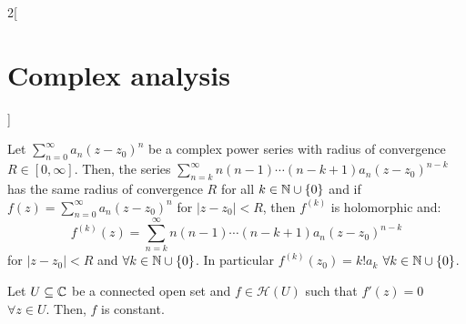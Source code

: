 \documentclass[../../../main_math.tex]{subfiles}
\begin{document}
\begin{multicols}{2}[\section{Complex analysis}]
\begin{theorem}
  \end{theorem}
  \begin{corollary}
    Let $\sum_{n=0}^\infty a_n{(z-z_0)}^n$ be a complex power series with radius of convergence $R\in[0,\infty]$. Then, the series $\sum_{n=k}^\infty n(n-1)\cdots(n-k+1)a_n{(z-z_0)}^{n-k}$ has the same radius of convergence $R$ for all $k\in\mathbb{N} \cup\{0\}$ and if $f(z)=\sum_{n=0}^\infty a_n{(z-z_0)}^n$ for $|z-z_0|<R$, then $f^{(k)}$ is holomorphic and: $$f^{(k)}(z)=\sum_{n=k}^\infty n(n-1)\cdots(n-k+1)a_n{(z-z_0)}^{n-k}$$ for $|z-z_0|<R$ and $\forall k\in\mathbb{N} \cup\{0\}$. In particular $f^{(k)}(z_0)=k!a_k$ $\forall k\in\mathbb{N}\cup\{0\}$.
  \end{corollary}
  \begin{proposition}
    Let $U\subseteq\mathbb{C}$ be a connected open set and $f\in\mathcal{H}(U)$ such that $f'(z)=0$ $\forall z\in U$. Then, $f$ is constant.
  \end{proposition}

\end{multicols}
\end{document}
